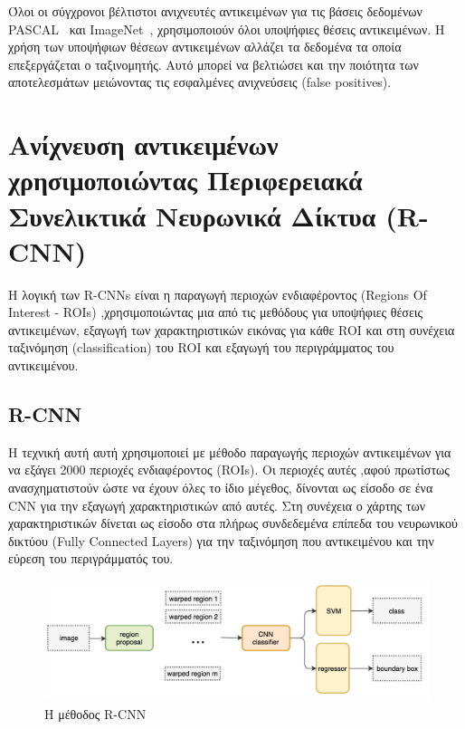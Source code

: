 Όλοι οι σύγχρονοι βέλτιστοι ανιχνευτές αντικειμένων για τις βάσεις δεδομένων
PASCAL~\cite{Everingham:2015:PVO:2725268.2725369} και ImageNet~\cite{DBLP:journals/corr/RussakovskyDSKSMHKKBBF14},
χρησιμοποιούν όλοι υποψήφιες θέσεις αντικειμένων.
Η χρήση των υποψήφιων θέσεων αντικειμένων αλλάζει τα δεδομένα τα οποία επεξεργάζεται
ο ταξινομητής. Αυτό μπορεί να βελτιώσει και την ποιότητα των αποτελεσμάτων
μειώνοντας τις εσφαλμένες ανιχνεύσεις (false positives).

\section{Ανίχνευση αντικειμένων χρησιμοποιώντας Περιφερειακά Συνελικτικά Νευρωνικά Δίκτυα (R-CNN)}\label{sec:objrcnn}

Η λογική των R-CNNs είναι η παραγωγή περιοχών ενδιαφέροντος (Regions Of Interest - ROIs)
,χρησιμοποιώντας μια από τις μεθόδους για υποψήφιες θέσεις αντικειμένων, εξαγωγή των χαρακτηριστικών
εικόνας για κάθε ROI και στη συνέχεια ταξινόμηση (classification) του ROI και
εξαγωγή του περιγράμματος του αντικειμένου.


\subsection{R-CNN}\label{sec:rcnn}
Η τεχνική αυτή αυτή χρησιμοποιεί με μέθοδο παραγωγής περιοχών αντικειμένων για να
εξάγει 2000 περιοχές ενδιαφέροντος (ROIs). Οι περιοχές αυτές ,αφού πρωτίστως
ανασχηματιστούν ώστε να έχουν όλες το ίδιο μέγεθος, δίνονται ως είσοδο σε ένα CNN
για την εξαγωγή χαρακτηριστικών από αυτές. Στη συνέχεια ο χάρτης των χαρακτηριστικών
δίνεται ως είσοδο στα πλήρως συνδεδεμένα επίπεδα του νευρωνικού δικτύου
(Fully Connected Layers) για την ταξινόμηση που αντικειμένου και
την εύρεση του περιγράμματός του.

\begin{figure}[htbp]
  \begin{center}
    \includegraphics[width=0.8\maxwidth]{../figures/rcnn2.png}
    \caption{Η μέθοδος R-CNN\label{fig:rcnn}}
   \end{center}
\end{figure}


